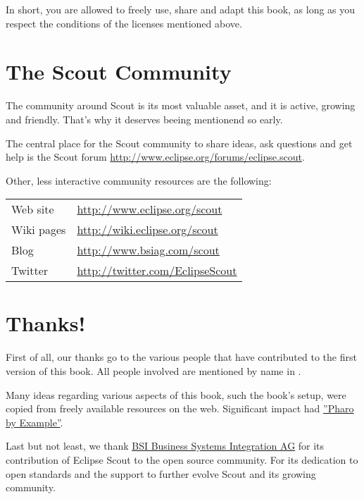 \documentclass[a4paper,10pt,twoside]{book}
\begin{document}
\noindent In short, you are allowed to freely use, share and adapt this book, as long as you respect the conditions of the licenses mentioned above.

\newpage

\section*{The Scout Community}

The community around Scout is its most valuable asset, and it is active, growing and friendly.
That's why it deserves beeing mentionend so early.

The central place for the Scout community to share ideas, ask questions and get help is the Scout forum
\url{http://www.eclipse.org/forums/eclipse.scout}.

\noindent Other, less interactive community resources are the following:

\begin{tabular}{ll}
Web site   & \url{http://www.eclipse.org/scout} \\
Wiki pages & \url{http://wiki.eclipse.org/scout} \\
Blog       & \url{http://www.bsiag.com/scout} \\
Twitter    & \url{http://twitter.com/EclipseScout} \\
\end{tabular}

\section*{Thanks!}

First of all, our thanks go to the various people that have contributed to the first version of this book. 
All people involved are mentioned by name in .

Many ideas regarding various aspects of this book, such the book's setup, were copied from freely available resources on the web. 
Significant impact had \href{http://pharobyexample.org/}{''Pharo by Example''}.

Last but not least, we thank \href{http://www.bsiag.com/}{BSI Business Systems Integration AG} for its contribution of Eclipse Scout to the open source community.
For its dedication to open standards and the support to further evolve Scout and its growing community.


\ifx\wholebook\relax\else
   
   
\end{document}
